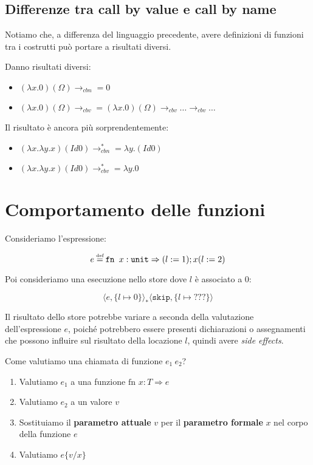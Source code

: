 \subsection{Differenze tra call by value e call by name}
Notiamo che, a differenza del linguaggio precedente, avere definizioni
di funzioni tra i costrutti può portare a risultati diversi. 
\begin{tcolorbox}
    Danno risultati diversi:
    \begin{itemize}
        \item $(\lambda x.0)(\Omega)\rightarrow_{cbn} = 0 $
        \item $(\lambda x.0)(\Omega)\rightarrow_{cbv} = (\lambda x.0)(\Omega)
        \rightarrow_{cbv}\dots \rightarrow_{cbv}\dots$
    \end{itemize}
\end{tcolorbox}
\begin{tcolorbox}
Il risultato è ancora più sorprendentemente:
\begin{itemize}
    \item $(\lambda x.\lambda y.x)(Id 0)\rightarrow^{*}_{ cbn} = \lambda y.(Id 0) $
    \item $(\lambda x.\lambda y.x)(Id 0)\rightarrow^{*}_{ cbv} = \lambda y.0$
\end{itemize}
\end{tcolorbox}
\section{Comportamento delle funzioni}

Consideriamo l'espressione:

\[ e \defeq \texttt{fn } x : \texttt{unit} \Rightarrow (l := 1);x(l := 2) \]

Poi consideriamo una esecuzione nello store dove $l$ è associato a $0$:

\[ \langle e, \{l \mapsto 0\} \rangle_* \langle \texttt{skip}, \{l \mapsto ???\} \rangle \]

Il risultato dello store potrebbe variare a seconda della valutazione dell'espressione $e$, poiché
potrebbero essere presenti dichiarazioni o assegnamenti che possono influire sul risultato della 
locazione $l$, quindi avere \textit{side effects}.

Come valutiamo una chiamata di funzione $e_1 \ e_2$?

\begin{tcolorbox}
[title = Call-by-value (\textit{detta anche valutazione eager})]
\begin{enumerate}
    \item Valutiamo $e_1$ a una funzione $\text{fn } x:T \Rightarrow e$
    \item Valutiamo $e_2$ a un valore $v$
    \item Sostituiamo il \textbf{parametro attuale} $v$ per il \textbf{parametro
    formale} $x$ nel corpo della funzione $e$
    \item Valutiamo $e\{v/x\}$
\end{enumerate}
\end{tcolorbox}

